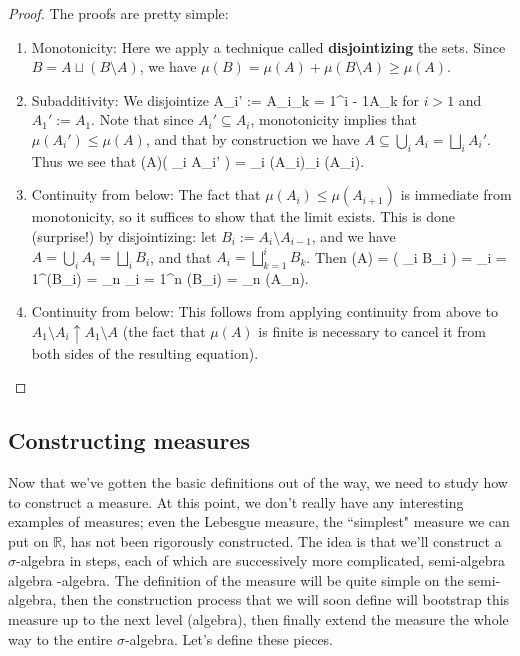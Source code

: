 \begin{proof}
The proofs are pretty simple:
	\begin{enumerate}
		\item Monotonicity: Here we apply a technique called \textbf{disjointizing} the sets. Since $B = A\sqcup (B\setminus A)$, we have $\mu(B) = \mu(A) + \mu(B\setminus A)\geq \mu(A)$. 
		\item Subadditivity: We disjointize 
		\eq
			A_i' := A_i\setminus \bigcup_{k = 1}^{i - 1}A_{k}
		\qe
		for $i > 1$ and $A_1' := A_1$. Note that since $A_i'\subseteq A_i$, monotonicity implies that $\mu(A_i')\leq \mu(A)$, and that by construction we have $A\subseteq \bigcup_i A_i = \bigsqcup_i A_i'$. Thus we see that 
		\eq
			\mu(A)\leq \mu\left( \bigsqcup_i A_i' \right) = \sum_i \mu(A_i)\leq \sum_i \mu(A_i).
		\qe
		\item Continuity from below: The fact that $\mu(A_i)\leq \mu(A_{i + 1})$ is immediate from monotonicity, so it suffices to show that the limit exists. This is done (surprise!) by disjointizing: let $B_i := A_i\setminus A_{i-1}$, and we have $A = \bigcup_i A_i = \bigsqcup_i B_i$, and that $A_i = \bigsqcup_{k = 1}^i B_k$. Then
		\eq
			\mu(A) = \mu\left( \bigsqcup_i B_i \right) = \sum_{i = 1}^\infty \mu(B_i) = \lim_{n\rightarrow\infty} \sum_{i = 1}^n \mu(B_i) = \lim_{n\rightarrow\infty} \mu(A_n).
		\qe
		\item Continuity from below: This follows from applying continuity from above to $A_1\setminus A_i \uparrow A_1\setminus A$ (the fact that $\mu(A)$ is finite is necessary to cancel it from both sides of the resulting equation). 
	\end{enumerate}
\end{proof}

\subsection{Constructing measures}

Now that we've gotten the basic definitions out of the way, we need to study how to construct a measure. At this point, we don't really have any interesting examples of measures; even the Lebesgue measure, the ``simplest" measure we can put on $\mathbb R$, has not been rigorously constructed. The idea is that we'll construct a $\sigma$-algebra in steps, each of which are successively more complicated,
\eq
	\textnormal{semi-algebra} \longrightarrow \textnormal{algebra} \longrightarrow \sigma\textnormal{-algebra}.
\qe
The definition of the measure will be quite simple on the semi-algebra, then the construction process that we will soon define will bootstrap this measure up to the next level (algebra), then finally extend the measure the whole way to the entire $\sigma$-algebra. Let's define these pieces. 

